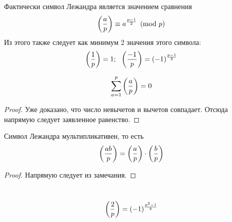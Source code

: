 \begin{note}
	Фактически символ Лежандра является значением сравнения
	\[
		\left(\frac{ a }{ p }\right) \equiv a^{\frac{p - 1}{2}} \pmod p
	\]
	Из этого также следует как минимум 2 значения этого символа:
	\[
		\left(\frac{ 1 }{ p }\right) = 1;\ \ \left(\frac{ -1 }{ p }\right) = (-1)^{\frac{p - 1}{2}}
	\]
\end{note}

\begin{proposition}
	\[
		\sum\limits_{a = 1}^p \left(\frac{ a }{ p }\right) = 0
	\]
\end{proposition}

\begin{proof}
	Уже доказано, что число невычетов и вычетов совпадает. Отсюда напрямую следует заявленное равенство.
\end{proof}

\begin{proposition}
	Символ Лежандра мультипликативен, то есть
	\[
		\left(\frac{ ab }{ p }\right) = \left(\frac{ a }{ p }\right) \cdot \left(\frac{ b }{ p }\right)
	\]
\end{proposition}

\begin{proof}
	Напрямую следует из замечания.
\end{proof}

\begin{theorem}~
	\[
		\left(\frac{ 2 }{ p }\right) = (-1)^{\frac{p^2 - 1}{8}}
	\]
\end{theorem}

